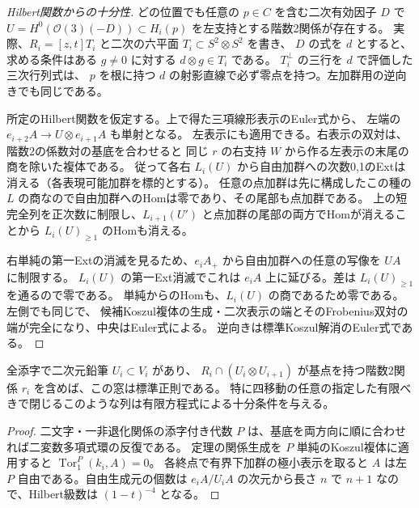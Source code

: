 \begin{proof}[Hilbert関数からの十分性]
どの位置でも任意の $p\in C$ を含む二次有効因子 $D$ で
$U=H^0(\mathcal O(3)(-D))\subset H_i(p)$ を左支持とする階数2関係が存在する。
実際、$R_i=[z,t]T_i$ と二次の六平面 $T_i\subset S^2\otimes S^2$ を書き、
$D$ の式を $d$ とすると、求める条件はある $g\ne0$ に対する $d\otimes g\in T_i$ である。
$T_i^\perp$ の三行を $d$ で評価した三次行列式は、
$p$ を根に持つ $d$ の射影直線で必ず零点を持つ。左加群用の逆向きでも同じである。

所定のHilbert関数を仮定する。上で得た三項線形表示のEuler式から、
左端の $e_{i+2}A\to U\otimes e_{i+1}A$ も単射となる。
左表示にも適用できる。右表示の双対は、階数2の係数対の基底を合わせると
同じ $r$ の右支持 $W$ から作る左表示の末尾の商を除いた複体である。
従って各右 $L_i(U)$ から自由加群への次数0,1のExtは消える（各表現可能加群を標的とする）。
任意の点加群は先に構成したこの種の $L$ の商なので自由加群へのHomは零であり、その尾部も点加群である。
上の短完全列を正次数に制限し、$L_{i+1}(U')$ と点加群の尾部の両方でHomが消えることから
$L_i(U)_{\ge1}$ のHomも消える。

右単純の第一Extの消滅を見るため、$e_iA_+$ から自由加群への任意の写像を $UA$ に制限する。
$L_i(U)$ の第一Ext消滅でこれは $e_iA$ 上に延びる。差は $L_i(U)_{\ge1}$ を通るので零である。
単純からのHomも、$L_i(U)$ の商であるため零である。左側でも同じで、
候補Koszul複体の生成・二次表示の端とそのFrobenius双対の端が完全になり、中央はEuler式による。
逆向きは標準Koszul解消のEuler式である。
\end{proof}

\begin{corollary}\label{cor:twisted-cubic-compatible-pencils}
全添字で二次元鉛筆 $U_i\subset V_i$ があり、
$R_i\cap(U_i\otimes U_{i+1})$ が基点を持つ階数2関係 $r_i$ を含めば、この窓は標準正則である。
特に四移動の任意の指定した有限べきで閉じるこのような列は有限方程式による十分条件を与える。
\end{corollary}
\begin{proof}
二文字・一非退化関係の添字付き代数 $P$ は、基底を両方向に順に合わせれば二変数多項式環の反復である。
定理の関係生成を $P$ 単純のKoszul複体に適用すると $\operatorname{Tor}_1^P(k_i,A)=0$。
各終点で有界下加群の極小表示を取ると $A$ は左 $P$ 自由である。自由生成元の個数は
$e_iA/U_iA$ の次元から長さ $n$ で $n+1$ なので、Hilbert級数は $(1-t)^{-4}$ となる。
\end{proof}

